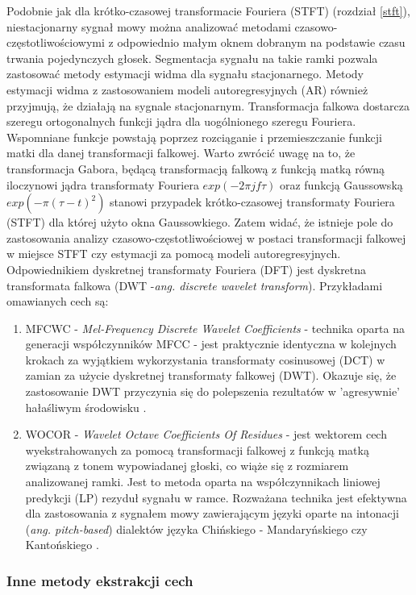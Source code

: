 Podobnie jak dla krótko-czasowej transformacie Fouriera (STFT) (rozdział \ref{stft}), niestacjonarny sygnał mowy można analizować metodami czasowo-częstotliwościowymi z odpowiednio małym oknem dobranym na podstawie czasu trwania pojedynczych głosek. Segmentacja sygnału na takie ramki pozwala zastosować metody estymacji widma dla sygnału stacjonarnego. Metody estymacji widma z zastosowaniem modeli autoregresyjnych (AR) również przyjmują, że działają na sygnale stacjonarnym. Transformacja falkowa dostarcza szeregu ortogonalnych funkcji jądra dla uogólnionego szeregu Fouriera. Wspomniane funkcje powstają poprzez rozciąganie i przemieszczanie funkcji matki dla danej transformacji falkowej. Warto zwrócić uwagę na to, że transformacja Gabora, będącą transformacją falkową z funkcją matką równą iloczynowi jądra transformaty Fouriera $ exp(-2\pi j f \tau)$ oraz funkcją Gaussowską $ exp(-\pi(\tau-t)^2) $ stanowi przypadek krótko-czasowej transformaty Fouriera (STFT) dla której użyto okna Gaussowkiego. Zatem widać, że istnieje pole do zastosowania analizy czasowo-częstotliwościowej w postaci transformacji falkowej w miejsce STFT czy estymacji za pomocą modeli autoregresyjnych. Odpowiednikiem dyskretnej transformaty Fouriera (DFT) jest dyskretna transformata falkowa (DWT -\textit{ang. discrete wavelet transform}).
Przykładami omawianych cech są:
\begin{enumerate}
  \item{MFCWC - \textit{Mel-Frequency Discrete Wavelet Coefficients}} - technika oparta na generacji współczynników MFCC - jest praktycznie identyczna w kolejnych krokach za wyjątkiem wykorzystania transformaty cosinusowej (DCT) w zamian za użycie dyskretnej transformaty falkowej (DWT). Okazuje się, że zastosowanie DWT przyczynia się do polepszenia rezultatów w 'agresywnie' hałaśliwym środowisku \cite{fosr}.
  \item{WOCOR - \textit{Wavelet Octave Coefficients Of Residues}} - jest wektorem cech wyekstrahowanych za pomocą transformacji falkowej z funkcją matką związaną z tonem wypowiadanej głoski, co wiąże się z rozmiarem analizowanej ramki. Jest to metoda oparta na współczynnikach liniowej predykcji (LP) rezyduł sygnału w ramce. Rozważana technika jest efektywna dla zastosowania z sygnałem mowy zawierającym języki oparte na intonacji (\textit{ang. pitch-based}) dialektów języka Chińskiego  - Mandaryńskiego czy Kantońskiego \cite{fosr}.
\end{enumerate}

\subsubsection{Inne metody ekstrakcji cech}
\label{otherfeatures}

